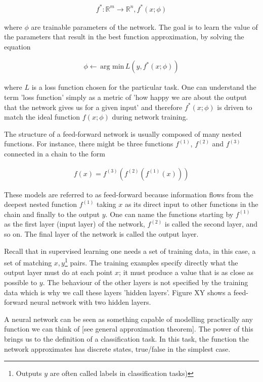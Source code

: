 \begin{gather}
f^*: \mathbb{R}^m \rightarrow \mathbb{R}^n, f^*(x;\phi)
\end{gather}

\noindent where $ \phi $ are trainable parameters of the network. The goal is to learn the value of the parameters that result in the best function approximation, by solving the equation

\begin{gather}
\phi \leftarrow \, \text{arg min} \, L(y, f^*(x;\phi))
\end{gather}

\noindent where $ L $ is a loss function chosen for the particular task. One can understand the term 'loss function' simply as a metric of 'how happy we are about the output that the network gives us for a given input' and therefore $f^*(x;\phi)$ is driven to match the ideal function $f(x;\phi)$ during network training. 

The structure of a feed-forward network is usually composed of many nested functions. For instance, there might be three functions $f^{(1)}$, $f^{(2)}$ and $f^{(3)}$ connected in a chain to the form

\begin{gather}
f(x) = f^{(3)}(f^{(2)}(f^{(1)}(x)))
\end{gather}

These models are referred to as feed-forward because information flows from the deepest nested function $f^{(1)}$ taking $ x $ as its direct input to other functions in the chain and finally to the output $ y $. One can name the functions starting by $f^{(1)}$ as the first layer (input layer) of the network, $f^{(2)}$ is called the second layer, and so on. The final layer of the network is called the output layer. 

Recall that in supervised learning one needs a set of training data, in this case, a set of matching $ x, y $\footnote{Outputs $ y $ are often called labels in classification tasks)}  pairs. The training examples specify directly what the output layer must do at each point $ x $; it must produce a value that is as close as possible to $ y $. The behaviour of the other layers is not specified by the training data which is why we call these layers 'hidden layers'. Figure XY shows a feed-forward neural network with two hidden layers.

A neural network can be seen as something capable of modelling practically any function we can think of [see general approximation theorem]. The power of this brings us to the definition of a classification task. In this task, the function the network approximates has discrete states, true/false in the simplest case. 

